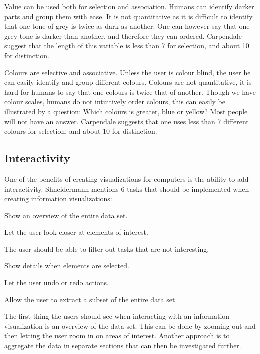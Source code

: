 Value can be used both for selection and association. Humans can identify darker parts and group them with ease. It is not quantitative as it is difficult to identify that one tone of grey is twice as dark as another. One can however say that one grey tone is darker than another, and therefore they can ordered. Carpendale suggest that the length of this variable is less than 7 for selection, and about 10 for distinction.

Colours are selective and associative. Unless the user is colour blind, the user he can easily identify and group different colours. Colours are not quantitative, it is hard for humans to say that one colours is twice that of another. Though we have colour scales, humans do not intuitively order colours, this can easily be illustrated by a question: Which colours is greater, blue or yellow? Most people will not have an answer. Carpendale suggests that one uses less than 7 different colours for selection, and about 10 for distinction.

\subsection{Interactivity}
One of the benefits of creating visualizations for computers is the ability to add interactivity. Shneidermann mentions 6 tasks that should be implemented when creating information visualizations:

\begin{description}[itemsep=3pt, parsep=0cm]
  \item[Overview] Show an overview of the entire data set.
  \item[Zoom] Let the user look closer at elements of interest.
  \item[Filter] The user should be able to filter out tasks that are not interesting.
  \item[Details-on-demand] Show details when elements are selected.
  \item[History] Let the user undo or redo actions.
  \item[Extract] Allow the user to extract a subset of the entire data set.
\end{description}

The first thing the users should see when interacting with an information visualization is an overview of the data set. This can be done by zooming out and then letting the user zoom in on areas of interest. Another approach is to aggregate the data in separate sections that can then be investigated further.

